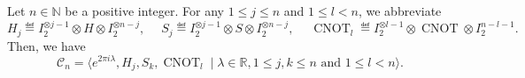 \documentclass[a4paper, oneside, 12pt]{amsart}
\DeclareMathOperator{\CNOT}{CNOT}
\begin{document}
\begin{lemma}\label{lem:Clifford-group-generated}
  Let \(n\in \mathbb{N}\) be a positive integer.
  For any \(1\leq j \leq n\) and \(1\leq l<n\), we abbreviate
  \begin{equation*}
    H_{j} \eqdef I_{2}^{\otimes j-1} \otimes H \otimes I_{2}^{\otimes n-j}, \quad\;
    S_{j} \eqdef I_{2}^{\otimes j-1} \otimes S \otimes I_{2}^{\otimes n-j}, \quad\;
    \CNOT_{l} \eqdef I_{2}^{\otimes l-1}\otimes \CNOT \otimes I_{2}^{n-l-1}.
  \end{equation*}
  Then, we have
  \begin{equation}
      \mathcal{C}_n = \langle e^{2\pi i \lambda}, H_j, S_k, \CNOT_{l} \mid \lambda \in \mathbb{R},  1\leq j,k \leq n \text{ and } 1\leq  l <n\rangle.
  \end{equation}
\end{lemma}
\end{document}
